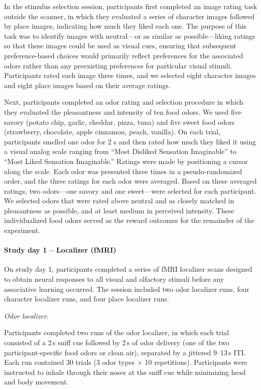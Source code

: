 \documentclass[9pt,twoside,lineno]{pnas-new}
\begin{document}
In the stimulus selection session, participants first completed an image rating task outside the scanner, in which they evaluated a series of character images followed by place images, indicating how much they liked each one. The purpose of this task was to identify images with neutral---or as similar as possible---liking ratings so that these images could be used as visual cues, ensuring that subsequent preference-based choices would primarily reflect preferences for the associated odors rather than any preexisting preferences for particular visual stimuli. Participants rated each image three times, and we selected eight character images and eight place images based on their average ratings.

Next, participants completed an odor rating and selection procedure in which they evaluated the pleasantness and intensity of ten food odors. We used five savory (potato chip, garlic, cheddar, pizza, tuna) and five sweet food odors (strawberry, chocolate, apple cinnamon, peach, vanilla). On each trial, participants smelled one odor for 2 s and then rated how much they liked it using a visual analog scale ranging from “Most Disliked Sensation Imaginable” to “Most Liked Sensation Imaginable.” Ratings were made by positioning a cursor along the scale. Each odor was presented three times in a pseudo-randomized order, and the three ratings for each odor were averaged. Based on these averaged ratings, two odors—one savory and one sweet—were selected for each participant. We selected odors that were rated above neutral and as closely matched in pleasantness as possible, and at least medium in perceived intensity. These individualized food odors served as the reward outcomes for the remainder of the experiment.

\paragraph*{Study day 1 – Localizer (fMRI)}

On study day 1, participants completed a series of fMRI localizer scans designed to obtain neural responses to all visual and olfactory stimuli before any associative learning occurred. The session included two odor localizer runs, four character localizer runs, and four place localizer runs.

\textit{Odor localizer.}

Participants completed two runs of the odor localizer, in which each trial consisted of a 2\,s sniff cue followed by 2\,s of odor delivery (one of the two participant-specific food odors or clean air), separated by a jittered 9--13\,s ITI. Each run contained 30 trials (3 odor types $\times$ 10 repetitions). Participants were instructed to inhale through their noses at the sniff cue while minimizing head and body movement.
\end{document}
